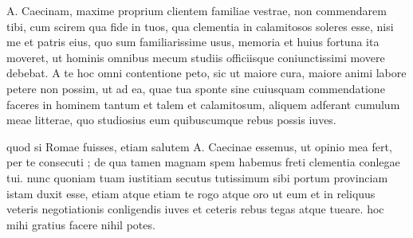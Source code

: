 


 A. Caecinam, maxime proprium clientem familiae vestrae, non commendarem tibi, cum scirem qua fide in tuos, qua clementia in calamitosos soleres esse, nisi me et patris eius, quo sum familiarissime usus, memoria et huius fortuna ita moveret, ut hominis omnibus mecum studiis officiisque coniunctissimi movere debebat. A te hoc omni contentione peto, sic ut maiore cura, maiore animi labore petere non possim, ut ad ea, quae tua sponte sine cuiusquam commendatione faceres in hominem tantum et talem et calamitosum, aliquem adferant cumulum meae litterae, quo studiosius eum quibuscumque rebus possis iuves.

 quod si Romae fuisses, etiam salutem A. Caecinae essemus, ut opinio mea fert, per te consecuti ; de qua tamen magnam spem habemus freti clementia conlegae tui. nunc quoniam tuam iustitiam secutus tutissimum sibi portum provinciam istam duxit esse, etiam atque etiam te rogo atque oro ut eum et in reliquus veteris negotiationis conligendis iuves et ceteris rebus tegas atque tueare. hoc mihi gratius facere nihil potes.
